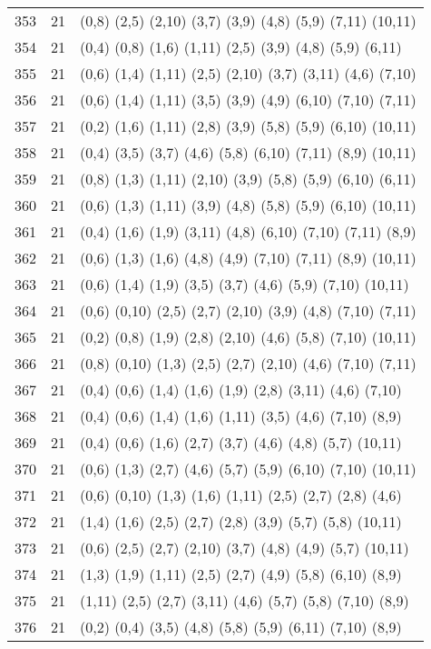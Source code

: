 {\begin{longtable}{lll}
353 & 21 & (0,8) (2,5) (2,10) (3,7) (3,9) (4,8) (5,9) (7,11) (10,11) \\
354 & 21 & (0,4) (0,8) (1,6) (1,11) (2,5) (3,9) (4,8) (5,9) (6,11) \\
355 & 21 & (0,6) (1,4) (1,11) (2,5) (2,10) (3,7) (3,11) (4,6) (7,10) \\
356 & 21 & (0,6) (1,4) (1,11) (3,5) (3,9) (4,9) (6,10) (7,10) (7,11) \\
357 & 21 & (0,2) (1,6) (1,11) (2,8) (3,9) (5,8) (5,9) (6,10) (10,11) \\
358 & 21 & (0,4) (3,5) (3,7) (4,6) (5,8) (6,10) (7,11) (8,9) (10,11) \\
359 & 21 & (0,8) (1,3) (1,11) (2,10) (3,9) (5,8) (5,9) (6,10) (6,11) \\
360 & 21 & (0,6) (1,3) (1,11) (3,9) (4,8) (5,8) (5,9) (6,10) (10,11) \\
361 & 21 & (0,4) (1,6) (1,9) (3,11) (4,8) (6,10) (7,10) (7,11) (8,9) \\
362 & 21 & (0,6) (1,3) (1,6) (4,8) (4,9) (7,10) (7,11) (8,9) (10,11) \\
363 & 21 & (0,6) (1,4) (1,9) (3,5) (3,7) (4,6) (5,9) (7,10) (10,11) \\
364 & 21 & (0,6) (0,10) (2,5) (2,7) (2,10) (3,9) (4,8) (7,10) (7,11) \\
365 & 21 & (0,2) (0,8) (1,9) (2,8) (2,10) (4,6) (5,8) (7,10) (10,11) \\
366 & 21 & (0,8) (0,10) (1,3) (2,5) (2,7) (2,10) (4,6) (7,10) (7,11) \\
367 & 21 & (0,4) (0,6) (1,4) (1,6) (1,9) (2,8) (3,11) (4,6) (7,10) \\
368 & 21 & (0,4) (0,6) (1,4) (1,6) (1,11) (3,5) (4,6) (7,10) (8,9) \\
369 & 21 & (0,4) (0,6) (1,6) (2,7) (3,7) (4,6) (4,8) (5,7) (10,11) \\
370 & 21 & (0,6) (1,3) (2,7) (4,6) (5,7) (5,9) (6,10) (7,10) (10,11) \\
371 & 21 & (0,6) (0,10) (1,3) (1,6) (1,11) (2,5) (2,7) (2,8) (4,6) \\
372 & 21 & (1,4) (1,6) (2,5) (2,7) (2,8) (3,9) (5,7) (5,8) (10,11) \\
373 & 21 & (0,6) (2,5) (2,7) (2,10) (3,7) (4,8) (4,9) (5,7) (10,11) \\
374 & 21 & (1,3) (1,9) (1,11) (2,5) (2,7) (4,9) (5,8) (6,10) (8,9) \\
375 & 21 & (1,11) (2,5) (2,7) (3,11) (4,6) (5,7) (5,8) (7,10) (8,9) \\
376 & 21 & (0,2) (0,4) (3,5) (4,8) (5,8) (5,9) (6,11) (7,10) (8,9) \\

\end{longtable}}
